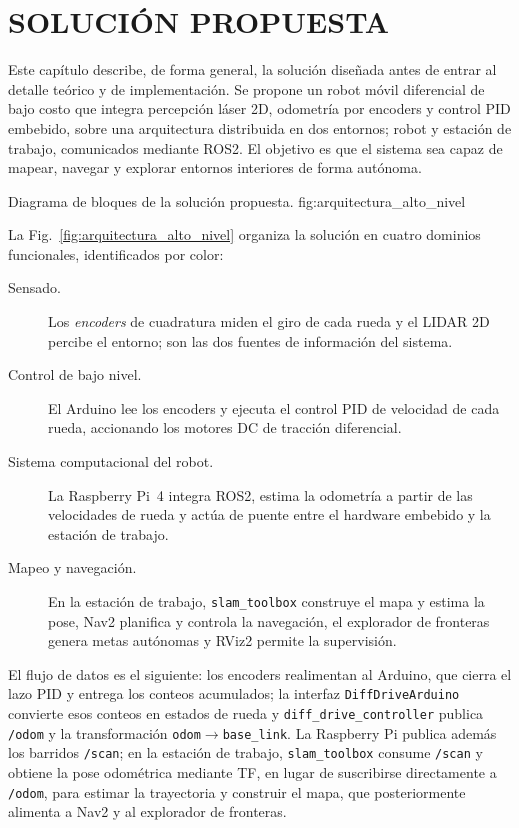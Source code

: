 \chapter{SOLUCIÓN PROPUESTA}
\label{ch:solucion}

Este capítulo describe, de forma general, la solución diseñada antes de entrar
al detalle teórico y de implementación. Se propone un robot móvil diferencial
de bajo costo que integra percepción láser 2D, odometría por encoders y control
PID embebido, sobre una arquitectura distribuida en dos entornos; robot y
estación de trabajo, comunicados mediante \gls{ROS2}. El objetivo es que el
sistema sea capaz de mapear, navegar y explorar entornos interiores de forma
autónoma.

{Diagrama de bloques de la solución propuesta.}
{fig:arquitectura_alto_nivel}

La Fig.~\ref{fig:arquitectura_alto_nivel} organiza la solución en cuatro
dominios funcionales, identificados por color:

\begin{description}
\item[Sensado.] Los \emph{encoders} de cuadratura miden el giro de cada rueda
y el \gls{LIDAR} 2D percibe el entorno; son las dos fuentes de información del
sistema.
\item[Control de bajo nivel.] El \gls{Arduino} lee los encoders y ejecuta el
control PID de velocidad de cada rueda, accionando los motores DC de tracción
diferencial.
\item[Sistema computacional del robot.] La Raspberry Pi~4 integra \gls{ROS2},
estima la odometría a partir de las velocidades de rueda y actúa de puente
entre el hardware embebido y la estación de trabajo.
\item[Mapeo y navegación.] En la estación de trabajo, \texttt{slam\_toolbox}
construye el mapa y estima la pose, Nav2 planifica y controla la navegación,
el explorador de fronteras genera metas autónomas y RViz2 permite la
supervisión.
\end{description}

El flujo de datos es el siguiente: los encoders realimentan al Arduino, que
cierra el lazo PID y entrega los conteos acumulados; la interfaz
\texttt{DiffDriveArduino} convierte esos conteos en estados de rueda y
\texttt{diff\_drive\_controller} publica \texttt{/odom} y la transformación
\texttt{odom}$\rightarrow$\texttt{base\_link}. La Raspberry Pi publica además
los barridos \texttt{/scan}; en la estación de trabajo,
\texttt{slam\_toolbox} consume \texttt{/scan} y obtiene la pose odométrica
mediante TF, en lugar de suscribirse directamente a \texttt{/odom}, para
estimar la trayectoria y construir el mapa, que posteriormente alimenta a
Nav2 y al explorador de fronteras.